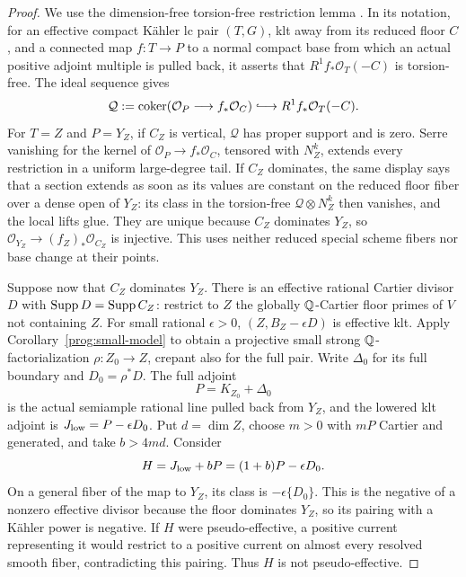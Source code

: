 \begin{proof}
We use the dimension-free torsion-free restriction lemma
\cite[Lemma~7.1]{BL}.  In its notation, for an effective compact K\"ahler
lc pair \((T,G)\), klt away from its reduced floor \(C\), and a connected
map \(f:T\to P\) to a normal compact base from which an actual positive
adjoint multiple is pulled back, it asserts that
\(R^1f_*\mathcal O_T(-C)\) is torsion-free.  The ideal sequence gives
\begin{equation}\label{floor:restriction-obstruction}
 \mathscr Q:=\coker(\mathcal O_P\longrightarrow f_*\mathcal O_C)
       \lhook\joinrel\longrightarrow R^1f_*\mathcal O_T(-C).
\end{equation}
For \(T=Z\) and \(P=Y_Z\), if \(C_Z\) is vertical, \(\mathscr Q\) has
proper support and is zero.  Serre vanishing for the kernel of
\(\mathcal O_P\to f_*\mathcal O_C\), tensored with \(N_Z^k\), extends
every restriction in a uniform large-degree tail.  If \(C_Z\) dominates,
the same display says that a section extends as soon as its values are
constant on the reduced floor fiber over a dense open of \(Y_Z\): its
class in the torsion-free \(\mathscr Q\otimes N_Z^k\) then vanishes, and
the local lifts glue.  They are unique because \(C_Z\) dominates \(Y_Z\),
so \(\mathcal O_{Y_Z}\to(f_Z)_*\mathcal O_{C_Z}\) is injective.
This uses neither reduced special scheme
fibers nor base change at their points.

Suppose now that \(C_Z\) dominates \(Y_Z\).  There is an effective rational
Cartier divisor \(D\) with \(\operatorname{Supp} D=\operatorname{Supp} C_Z\): restrict to \(Z\) the
globally \(\mathbb Q\)-Cartier floor primes of \(V\) not containing \(Z\).
For small rational
\(\epsilon>0\), \((Z,B_Z-\epsilon D)\) is effective klt.  Apply
Corollary~\ref{prog:small-model} to obtain a projective small strong
\(\mathbb Q\)-factorialization \(\rho:Z_0\to Z\), crepant also for the full pair.
Write \(\Delta_0\) for its full boundary and \(D_0=\rho^*D\).
The full adjoint
\[
 P=K_{Z_0}+\Delta_0
\]
is the actual semiample rational line pulled back from \(Y_Z\), and the
lowered klt adjoint is \(J_{\rm low}=P-\epsilon D_0\).  Put
\(d=\dim Z\), choose \(m>0\) with \(mP\) Cartier and generated, and take
\(b>4md\).  Consider
\[
 H=J_{\rm low}+bP=(1+b)P-\epsilon D_0.
\]
On a general fiber of the map to \(Y_Z\), its class is
\(-\epsilon\{D_0\}\).  This is the negative of a nonzero effective
divisor because the floor dominates \(Y_Z\), so its pairing with a
K\"ahler power is negative.  If \(H\) were pseudo-effective, a positive
current representing it would restrict to a positive current on almost
every resolved smooth fiber, contradicting this pairing.  Thus \(H\)
is not pseudo-effective.


\end{proof}
